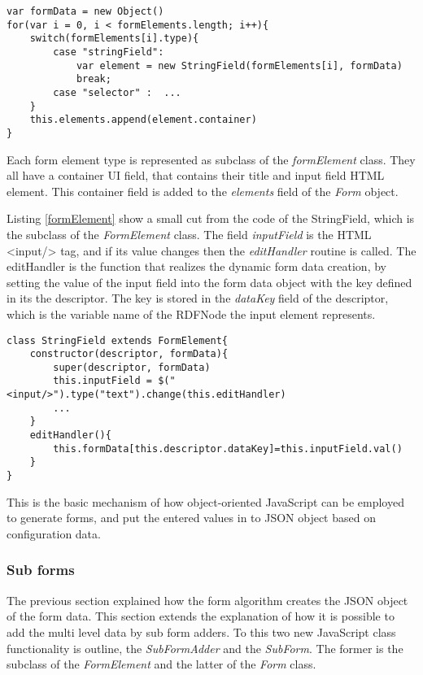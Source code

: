 \begin{lstlisting}[basicstyle=\footnotesize, frame=single, caption={Form generation based on configuration data}, label=formGen captionpos=b, belowskip=1em, aboveskip=2em]
var formData = new Object()
for(var i = 0, i < formElements.length; i++){
	switch(formElements[i].type){
		case "stringField":
			var element = new StringField(formElements[i], formData)
			break;
		case "selector" :  ...
	}
	this.elements.append(element.container)
}	
\end{lstlisting}


Each form element type is represented as subclass of the \textit{formElement} class. They all have a container UI field, that contains their title and input field HTML element. This container field is added to the \textit{elements} field of the \textit{Form} object.

Listing \ref{formElement} show a small cut from the code of the StringField, which is the subclass of the \textit{FormElement} class. The field \textit{inputField} is the HTML <input/> tag, and if its value changes then the \textit{editHandler} routine is called. The editHandler is the function that realizes the dynamic form data creation, by setting the value of the input field into the form data object with the key defined in its the descriptor. The key is stored in the \textit{dataKey} field of the descriptor, which is the variable name of the RDFNode the input element represents.


\begin{lstlisting}[basicstyle=\footnotesize, frame=single, caption={Form element}, label=formElement, captionpos=b, belowskip=1em, aboveskip=2em]
class StringField extends FormElement{
	constructor(descriptor, formData){
		super(descriptor, formData)
		this.inputField = $("<input/>").type("text").change(this.editHandler)
		...
	}
	editHandler(){
		this.formData[this.descriptor.dataKey]=this.inputField.val() 
	}			
}
\end{lstlisting}

This is the basic mechanism of how object-oriented JavaScript can be employed to generate forms, and put the entered values in to JSON object based on configuration data.


\subsubsection{Sub forms}


The previous section explained how the form algorithm creates the JSON object of the form data. This section extends the explanation of how it is possible to add the multi level data by sub form adders. To this two new JavaScript class functionality is outline, the \textit{SubFormAdder} and the \textit{SubForm}. The former is the subclass of the \textit{FormElement} and the latter of the \textit{Form} class. 

